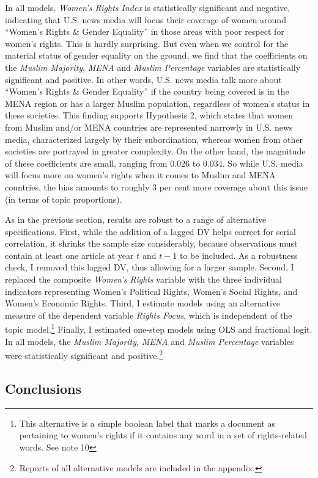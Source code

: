 \documentclass[11pt, oneside]{article}
\begin{document}
In all models, \emph{Women's Rights Index} is statistically significant and negative, indicating that U.S. news media will focus their coverage of women around ``Women's Rights \& Gender Equality'' in those areas with poor respect for women's rights. This is hardly surprising. But even when we control for the material status of gender equality on the ground, we find that the coefficients on the \emph{Muslim Majority}, \emph{MENA} and \emph{Muslim Percentage} variables are statistically significant and positive. In other words, U.S. news media talk more about ``Women's Rights \& Gender Equality'' if the country being covered is in the MENA region or has a larger Muslim population, regardless of women's status in these societies. This finding supports Hypothesis 2, which states that women from Muslim and/or MENA countries are represented narrowly in U.S. news media, characterized largely by their subordination, whereas women from other societies are portrayed in greater complexity. On the other hand, the magnitude of these coefficients are small, ranging from $0.026$ to $0.034$. So while U.S. media will focus more on women's rights when it comes to Muslim and MENA countries, the bias amounts to roughly 3 per cent more coverage about this issue (in terms of topic proportions).

As in the previous section, results are robust to a range of alternative specifications. First, while the addition of a lagged DV helps correct for serial correlation, it shrinks the sample size considerably, because observations must contain at least one article at year $t$ and $t-1$ to be included. As a robustness check, I removed this lagged DV, thus allowing for a larger sample. Second, I replaced the composite \emph{Women's Rights} variable with the three individual indicators representing Women's Political Rights, Women's Social Rights, and Women's Economic Rights. Third, I estimate models using an alternative measure of the dependent variable \emph{Rights Focus}, which is independent of the topic model.\footnote{This alternative is a simple boolean label that marks a document as pertaining to women's rights if it contains any word in a set of rights-related words. See note 10} Finally, I estimated one-step models using OLS and fractional logit. In all models,  the \emph{Muslim Majority}, \emph{MENA} and \emph{Muslim Percentage} variables were statistically significant and positive.\footnote{Reports of all alternative models are included in the appendix.}

\subsection{Conclusions}
\end{document}
